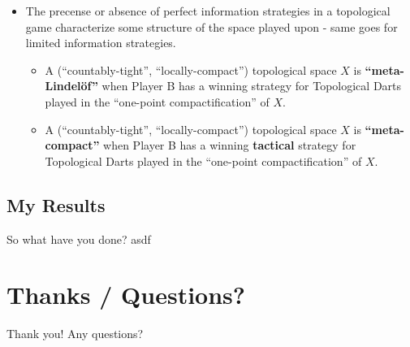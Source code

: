 \documentclass{beamer}
\begin{document}
\begin{frame}
  \begin{itemize}
    \item
      The precense or absence of perfect information strategies in a topological game characterize some structure of the space played upon - same goes for limited information strategies.
    \pause
    \begin{itemize}
      \item
        A (``countably-tight'', ``locally-compact'') topological space $X$ is \textbf{``meta-Lindel\"of''} when Player B has a winning strategy for Topological Darts played in the ``one-point compactification'' of $X$.
      \pause
      \item
        A (``countably-tight'', ``locally-compact'') topological space $X$ is \textbf{``meta-compact''} when Player B has a winning \textbf{tactical} strategy for Topological Darts played in the ``one-point compactification'' of $X$.
    \end{itemize}
  \end{itemize}
\end{frame}

\subsection{My Results}

\begin{frame}{So what have you done?}
asdf
\end{frame}

\section{Thanks / Questions?}

\begin{frame}{Thank you!}
Any questions?
\end{frame}
\end{document}
